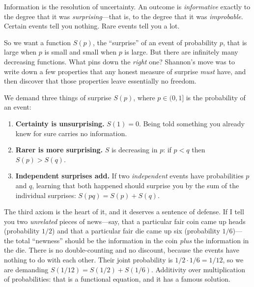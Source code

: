 \begin{intuitionbox}
Information is the resolution of uncertainty. An outcome is \emph{informative} exactly to the degree that
it was \emph{surprising}---that is, to the degree that it was \emph{improbable}. Certain events tell you
nothing. Rare events tell you a lot.
\end{intuitionbox}

So we want a function $S(p)$, the ``surprise'' of an event of probability $p$, that is large when $p$ is
small and small when $p$ is large. But there are infinitely many decreasing functions. What pins down the
\emph{right} one? Shannon's move was to write down a few properties that any honest measure of surprise
\emph{must} have, and then discover that those properties leave essentially no freedom.

\begin{focusbox}
We demand three things of surprise $S(p)$, where $p \in (0,1]$ is the probability of an event:
\begin{enumerate}
  \item \textbf{Certainty is unsurprising.} $S(1) = 0$. Being told something you already knew for sure
        carries no information.
  \item \textbf{Rarer is more surprising.} $S$ is decreasing in $p$: if $p < q$ then $S(p) > S(q)$.
  \item \textbf{Independent surprises add.} If two \emph{independent} events have probabilities $p$ and
        $q$, learning that both happened should surprise you by the sum of the individual surprises:
        $S(pq) = S(p) + S(q)$.
\end{enumerate}
\end{focusbox}

The third axiom is the heart of it, and it deserves a sentence of defense. If I tell you two
\emph{unrelated} pieces of news---say, that a particular fair coin came up heads (probability $1/2$) and
that a particular fair die came up six (probability $1/6$)---the total ``newness'' should be the
information in the coin \emph{plus} the information in the die. There is no double-counting and no
discount, because the events have nothing to do with each other. Their joint probability is $1/2 \cdot
1/6 = 1/12$, so we are demanding $S(1/12) = S(1/2) + S(1/6)$. Additivity over multiplication of
probabilities: that is a functional equation, and it has a famous solution.

